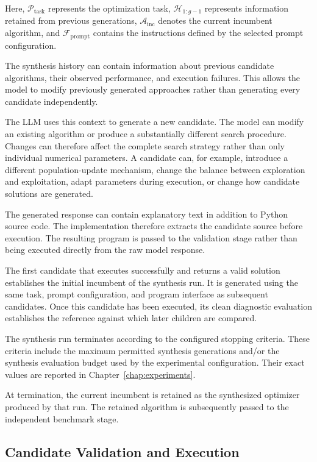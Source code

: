 Here, $\mathcal{P}_{\mathrm{task}}$ represents the optimization task,
$\mathcal{H}_{1:g-1}$ represents information retained from previous
generations, $\mathcal{A}_{\mathrm{inc}}$ denotes the current incumbent
algorithm, and $\mathcal{F}_{\mathrm{prompt}}$ contains the instructions
defined by the selected prompt configuration.

The synthesis history can contain information about previous candidate
algorithms, their observed performance, and execution failures. This allows
the model to modify previously generated approaches rather than generating
every candidate independently.

The LLM uses this context to generate a new candidate. The model can modify an
existing algorithm or produce a substantially different search procedure.
Changes can therefore affect the complete search strategy rather than only
individual numerical parameters. A candidate can, for example, introduce a
different population-update mechanism, change the balance between exploration
and exploitation, adapt parameters during execution, or change how candidate
solutions are generated.

The generated response can contain explanatory text in addition to Python
source code. The implementation therefore extracts the candidate source before
execution. The resulting program is passed to the validation stage rather
than being executed directly from the raw model response.

The first candidate that executes successfully and returns a valid solution
establishes the initial incumbent of the synthesis run. It is generated using the same task, prompt configuration, and program
interface as subsequent candidates. Once this candidate has been executed,
its clean diagnostic evaluation establishes the reference against which later
children are compared.

The synthesis run terminates according to the configured stopping criteria.
These criteria include the maximum permitted synthesis generations and/or the
synthesis evaluation budget used by the experimental configuration. Their
exact values are reported in Chapter~\ref{chap:experiments}.

At termination, the current incumbent is retained as the synthesized optimizer
produced by that run. The retained algorithm is subsequently passed to the
independent benchmark stage.


\subsection{Candidate Validation and Execution}
\label{subsec:candidate_validation_execution}

